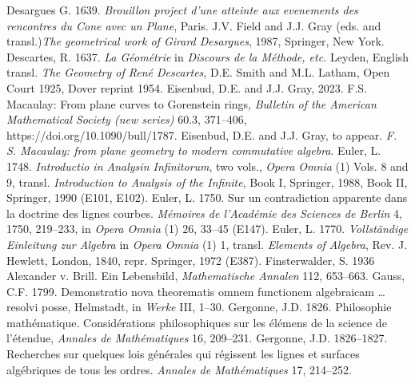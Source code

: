 \newline\indent Desargues G. 1639. \emph{Brouillon project d'une atteinte aux evenements des rencontres du Cone avec un Plane}, Paris.  J.V. Field  and J.J. Gray (eds. and transl.)\emph{The geometrical work of Girard Desargues}, 1987, Springer, New York.
\newline\indent Descartes, R. 1637. \emph{La G\'eom\'etrie} in \emph{Discours de la M\'ethode, etc.} Leyden, English transl. \emph{The Geometry of Ren\'e Descartes}, D.E. Smith and M.L. Latham, Open Court 1925, Dover reprint 1954.
\newline\indent Eisenbud, D.E. and J.J. Gray, 2023. F.S. Macaulay: From plane curves to Gorenstein rings, \emph{Bulletin  of the American Mathematical Society (new series)} 
60.3,  371--406, https://doi.org/10.1090/bull/1787.
\newline\indent Eisenbud, D.E. and J.J. Gray, to appear. \emph{F. S. Macaulay: from plane geometry to modern commutative algebra}.
\newline\indent  Euler, L. 1748. \emph{Introductio in Analysin Infinitorum}, two vols., \emph{Opera Omnia} (1) Vols. 8 and 9, transl. \emph{Introduction to Analysis of the Infinite}, Book I,  Springer, 1988, Book II, Springer, 1990 (E101, E102).
\newline\indent  Euler, L. 1750.  Sur un contradiction apparente dans la doctrine des lignes courbes. \emph{M\'emoires de l'Acad\'emie des Sciences de Berlin} 4, 1750, 219--233, in  \emph{Opera Omnia} (1)   26, 33--45 (E147).
\newline\indent Euler, L. 1770. \emph{Vollst\"andige Einleitung zur Algebra} in \emph{Opera Omnia} (1) 1,  transl. \emph{Elements of Algebra}, Rev. J. Hewlett, London, 1840, repr.  Springer, 1972 (E387).
\newline\indent Finsterwalder, S. 1936 Alexander v. Brill. Ein Lebensbild, \emph{Mathematische Annalen} 112, 653--663.
\newline\indent Gauss, C.F.  1799. Demonstratio nova theorematis omnem functionem algebraicam \ldots resolvi posse, Helmstadt, in \emph{Werke} III, 1--30.
\newline\indent Gergonne, J.D. 1826. Philosophie math\'ematique. Consid\'erations philo\-sophiques sur les \'el\'emens de la science de l'\'etendue, \emph{Annales de Math\'ematiques} 16, 209--231.
\newline\indent Gergonne, J.D. 1826--1827. Recherches sur quelques lois g\'en\'erales qui r\'egissent les lignes et surfaces alg\'ebriques de tous les ordres. \emph{Annales de Math\'ematiques} 17, 214--252. 
